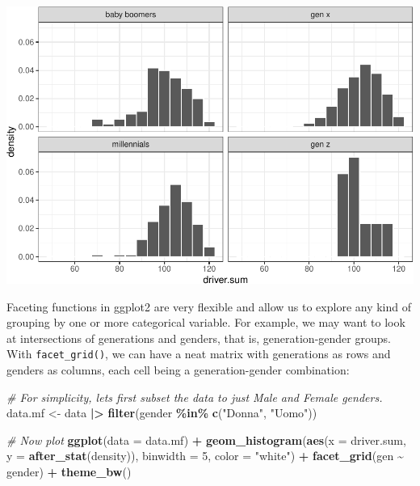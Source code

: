 \documentclass[
]{book}
\newenvironment{Shaded}{\begin{snugshade}}{\end{snugshade}}
\newcommand{\AttributeTok}[1]{\textcolor[rgb]{0.13,0.29,0.53}{#1}}
\newcommand{\CommentTok}[1]{\textcolor[rgb]{0.56,0.35,0.01}{\textit{#1}}}
\newcommand{\DecValTok}[1]{\textcolor[rgb]{0.00,0.00,0.81}{#1}}
\newcommand{\FunctionTok}[1]{\textcolor[rgb]{0.13,0.29,0.53}{\textbf{#1}}}
\newcommand{\NormalTok}[1]{#1}
\newcommand{\OtherTok}[1]{\textcolor[rgb]{0.56,0.35,0.01}{#1}}
\newcommand{\SpecialCharTok}[1]{\textcolor[rgb]{0.81,0.36,0.00}{\textbf{#1}}}
\newcommand{\StringTok}[1]{\textcolor[rgb]{0.31,0.60,0.02}{#1}}
\begin{document}
\includegraphics{R-for-social-research-and-business-analytics_files/figure-latex/unnamed-chunk-43-1.pdf}

Faceting functions in ggplot2 are very flexible and allow us to explore any kind of grouping by one or more categorical variable. For example, we may want to look at intersections of generations and genders, that is, generation-gender groups. With \texttt{facet\_grid()}, we can have a neat matrix with generations as rows and genders as columns, each cell being a generation-gender combination:

\begin{Shaded}
\begin{Highlighting}[]
\CommentTok{\# For simplicity, let\textquotesingle{}s first subset the data to just Male and Female genders.}
\NormalTok{data.mf }\OtherTok{\textless{}{-}}\NormalTok{ data }\SpecialCharTok{|\textgreater{}} 
  \FunctionTok{filter}\NormalTok{(gender }\SpecialCharTok{\%in\%} \FunctionTok{c}\NormalTok{(}\StringTok{"Donna"}\NormalTok{, }\StringTok{"Uomo"}\NormalTok{))}

\CommentTok{\# Now plot}
\FunctionTok{ggplot}\NormalTok{(}\AttributeTok{data =}\NormalTok{ data.mf) }\SpecialCharTok{+}
  \FunctionTok{geom\_histogram}\NormalTok{(}\FunctionTok{aes}\NormalTok{(}\AttributeTok{x =}\NormalTok{ driver.sum, }\AttributeTok{y =} \FunctionTok{after\_stat}\NormalTok{(density)), }\AttributeTok{binwidth =} \DecValTok{5}\NormalTok{, }\AttributeTok{color =} \StringTok{"white"}\NormalTok{) }\SpecialCharTok{+}
  \FunctionTok{facet\_grid}\NormalTok{(gen }\SpecialCharTok{\textasciitilde{}}\NormalTok{ gender) }\SpecialCharTok{+}
  \FunctionTok{theme\_bw}\NormalTok{()}
\end{Highlighting}
\end{Shaded}
\end{document}
